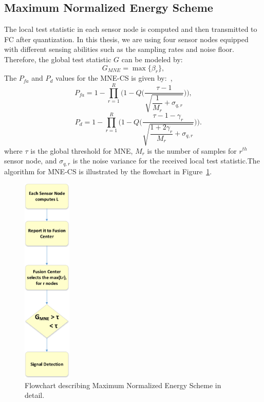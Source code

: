 \subsection{Maximum Normalized Energy Scheme}
The local test statistic in each sensor node is computed and then transmitted to FC after quantization. In this thesis, we are using four sensor nodes equipped with different sensing abilities such as the sampling rates and noise floor. Therefore, the global test statistic $G$ can be modeled by:
\begin{equation}
\label{eq:8}
G_{MNE} = \max\{\beta_r\},
\end{equation}
The $P_{fa}$ and $P_d$ values for the MNE-CS is given by:~\cite{inhtn12},
\begin{equation}
\label{eq:9}
P_{fa} = 1-\prod_{r=1}^R\Bigg(1-Q\Bigg(\dfrac{\tau-1}{\sqrt{\dfrac{1}{M_r}+\sigma_{q,r}}}\Bigg)\Bigg),
\end{equation}
\begin{equation}
\label{eq:10}
~~~~~~P_d = 1-\prod_{r=1}^R\Bigg(1-Q\Bigg(\dfrac{\tau-1-\gamma_r}{\sqrt{\dfrac{1+2\gamma_r}{M_r}+\sigma_{q,r}}}\Bigg)\Bigg).
\end{equation}
where $\tau$ is the global threshold for MNE, $M_r$ is the number of samples for $r^{th}$ sensor node, and $\sigma_{q,r}$ is the noise variance for the received local test statistic.The algorithm for MNE-CS is illustrated by the flowchart in Figure~\ref{mnescheme}.


\begin{figure}[ht!]
	\centering
	\includegraphics[width=\textwidth,height=10cm,keepaspectratio]{images/Gill/figs/mnescheme.eps}
\caption{Flowchart describing Maximum Normalized Energy Scheme in detail.} 
\label{mnescheme}      
\end{figure}


